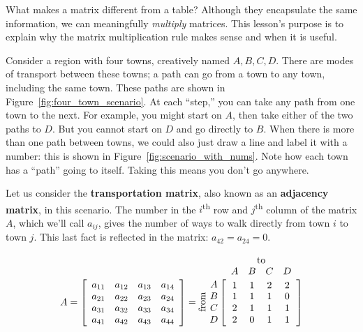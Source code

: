 \documentclass[../gatm.tex]{subfiles}
\begin{document}
What makes a matrix different from a table? Although they encapsulate the same information, we can meaningfully \textit{multiply} matrices. This lesson's purpose is to explain why the matrix multiplication rule makes sense and when it is useful.

Consider a region with four towns, creatively named $A,B,C,D$. There are modes of transport between these towns; a path can go from a town to any town, including the same town. These paths are shown in Figure~\ref{fig:four_town_scenario}. At each ``step,'' you can take any path from one town to the next. For example, you might start on $A$, then take either of the two paths to $D$. But you cannot start on $D$ and go directly to $B$. When there is more than one path between towns, we could also just draw a line and label it with a number: this is shown in Figure~\ref{fig:scenario_with_nums}. Note how each town has a ``path'' going to itself. Taking this means you don't go anywhere.

Let us consider the \textbf{transportation matrix}, also known as an \textbf{adjacency matrix}, in this scenario. The number in the $i$\textsuperscript{th} row and $j$\textsuperscript{th} column of the matrix $A$, which we'll call $a_{ij}$, gives the number of ways to walk directly from town $i$ to town $j$. This last fact is reflected in the matrix: $a_{42}=a_{24}=0$.

$$
  A = \left[\begin{array}{cccc}
  a_{11} & a_{12} & a_{13} & a_{14} \\
a_{21} & a_{22} & a_{23} & a_{24} \\
a_{31} & a_{32} & a_{33} & a_{34} \\
a_{41} & a_{42} & a_{43} & a_{44} \\
  \end{array}\right] =
  \rotatebox[origin=c]{90}{from}\;\,
  \begin{array}{@{}c@{}}
    \rowind{A} \\ \rowind{B} \\ \rowind{C} \\ \rowind{D}
  \end{array}
  \mathop{\left[
  \begin{array}{cccc}
     \colind{1}{A}  &  \colind{1}{B}  &  \colind{2}{C}  & \colind{2}{D} \\
1 & 1 & 1 & 0 \\
2 & 1 & 1 & 1 \\
2 & 0 & 1 & 1 \\
  \end{array}
  \right]}^{
  \begin{array}{@{}c@{}}
    \rowind{\text{to}} \\ \mathstrut
  \end{array}
  }
$$
\end{document}

